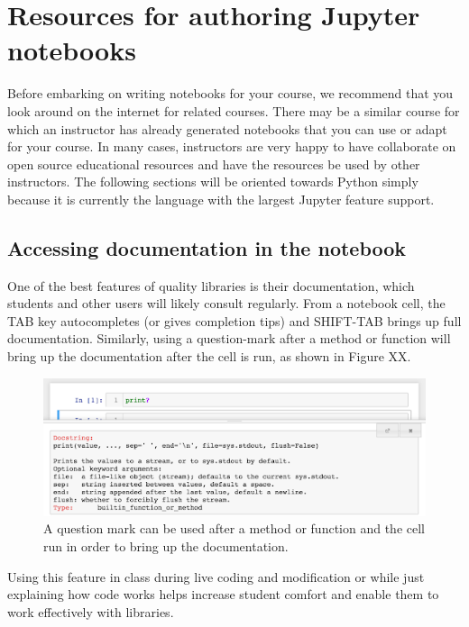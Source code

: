\documentclass[]{book}
\begin{document}
\section{Resources for authoring Jupyter
notebooks}\label{resources-for-authoring-jupyter-notebooks}

Before embarking on writing notebooks for your course, we recommend that
you look around on the internet for related courses. There may be a
similar course for which an instructor has already generated notebooks
that you can use or adapt for your course. In many cases, instructors
are very happy to have collaborate on open source educational resources
and have the resources be used by other instructors. The following
sections will be oriented towards Python simply because it is currently
the language with the largest Jupyter feature support.

\subsection{Accessing documentation in the
notebook}\label{accessing-documentation-in-the-notebook}

One of the best features of quality libraries is their documentation,
which students and other users will likely consult regularly. From a
notebook cell, the TAB key autocompletes (or gives completion tips) and
SHIFT-TAB brings up full documentation. Similarly, using a question-mark
after a method or function will bring up the documentation after the
cell is run, as shown in Figure XX.

\begin{figure}
\centering
\includegraphics{images/chapter50.png}
\caption{A question mark can be used after a method or function and the
cell run in order to bring up the documentation.}
\end{figure}

Using this feature in class during live coding and modification or while
just explaining how code works helps increase student comfort and enable
them to work effectively with libraries.
\end{document}
